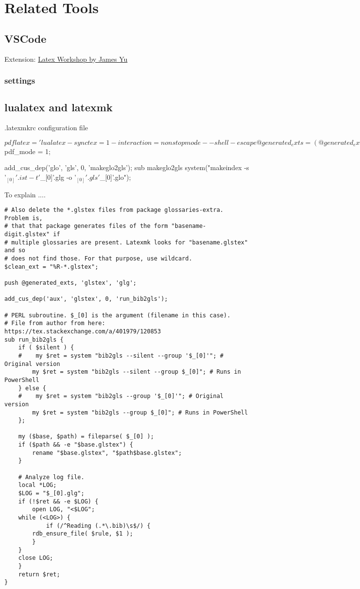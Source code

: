 \section{Related Tools}
\subsection{VSCode}
Extension: \href{https://marketplace.visualstudio.com/items?itemName=James-Yu.latex-workshop}{Latex Workshop by James Yu}

\subsubsection{settings}

\subsection{lualatex and latexmk}
.latexmkrc configuration file
\begin{verbatim*}
	$pdflatex = 'lualatex -synctex=1 -interaction=nonstopmode --shell-escape %O %S';
		@generated_exts = (@generated_exts, 'synctex.gz');
	$pdf_mode = 1;

	add_cus_dep('glo', 'gls', 0, 'makeglo2gls');
	sub makeglo2gls {
			system("makeindex -s '$_[0]'.ist -t '$_[0]'.glg -o '$_[0]'.gls '$_[0]'.glo");
		}
\end{verbatim*}
To explain ....
\begin{verbatim}
# Also delete the *.glstex files from package glossaries-extra. Problem is,
# that that package generates files of the form "basename-digit.glstex" if
# multiple glossaries are present. Latexmk looks for "basename.glstex" and so
# does not find those. For that purpose, use wildcard.
$clean_ext = "%R-*.glstex";

push @generated_exts, 'glstex', 'glg';

add_cus_dep('aux', 'glstex', 0, 'run_bib2gls');

# PERL subroutine. $_[0] is the argument (filename in this case).
# File from author from here: https://tex.stackexchange.com/a/401979/120853
sub run_bib2gls {
    if ( $silent ) {
    #    my $ret = system "bib2gls --silent --group '$_[0]'"; # Original version
        my $ret = system "bib2gls --silent --group $_[0]"; # Runs in PowerShell
    } else {
    #    my $ret = system "bib2gls --group '$_[0]'"; # Original version
        my $ret = system "bib2gls --group $_[0]"; # Runs in PowerShell
    };

    my ($base, $path) = fileparse( $_[0] );
    if ($path && -e "$base.glstex") {
        rename "$base.glstex", "$path$base.glstex";
    }

    # Analyze log file.
    local *LOG;
    $LOG = "$_[0].glg";
    if (!$ret && -e $LOG) {
        open LOG, "<$LOG";
    while (<LOG>) {
            if (/^Reading (.*\.bib)\s$/) {
        rdb_ensure_file( $rule, $1 );
        }
    }
    close LOG;
    }
    return $ret;
}
\end{verbatim}


